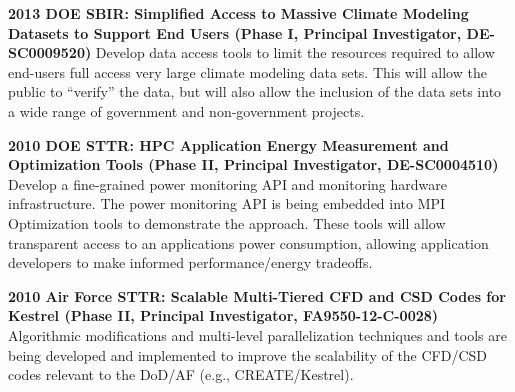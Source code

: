 \begin{itemize}
 	
 	
 	
 	\textbf{2013 DOE SBIR: Simplified Access to Massive Climate
 		Modeling Datasets to Support End Users (Phase I, Principal
 		Investigator, DE-SC0009520)}
 	Develop data access tools to limit
 	the resources required to allow end-users full access very large
 	climate modeling data sets. This will allow the public to
 	``verify'' the data, but will also allow the inclusion of the data
 	sets into a wide range of government and non-government projects.
 	
 	
 	
 	\textbf{2010 DOE STTR: HPC Application Energy Measurement and
 	   Optimization Tools (Phase II, Principal Investigator,
 	   DE-SC0004510)}
 	Develop a fine-grained power monitoring API
 	   and monitoring hardware infrastructure.  The power monitoring API
 	   is being embedded into MPI Optimization tools to demonstrate the
 	   approach.  These tools will allow transparent access to an
 	   applications power consumption, allowing application developers to
 	   make informed performance/energy tradeoffs.
 	
 	\textbf{2010 Air Force STTR: Scalable Multi-Tiered CFD and CSD
 		Codes for Kestrel (Phase II, Principal Investigator,
 		FA9550-12-C-0028)}
 	Algorithmic modifications and multi-level
 	parallelization techniques and tools are being developed and
 	implemented to improve the scalability of the CFD/CSD codes
 	relevant to the DoD/AF (e.g., CREATE/Kestrel).
 	

\end{itemize}
